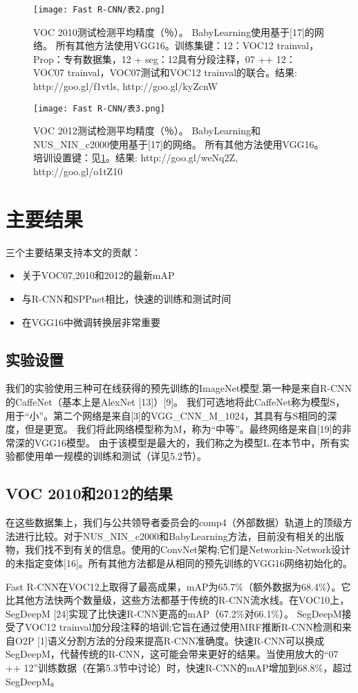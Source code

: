 \begin{figure}[h]
    \centering
    \texttt{[image: Fast R-CNN/表2.png]}
    \caption{ VOC 2010测试检测平均精度（％）。 BabyLearning使用基于[17]的网络。 所有其他方法使用VGG16。训练集键：12：VOC12 trainval，Prop：专有数据集，12 + seg：12具有分段注释，07 ++ 12：VOC07 trainval，VOC07测试和VOC12 trainval的联合。结果: http://goo.gl/f1vtls, http://goo.gl/kyZcnW}
    \label{表2}
\end{figure}

\begin{figure}[h]
    \centering
    \texttt{[image: Fast R-CNN/表3.png]}
    \caption{VOC 2012测试检测平均精度（％）。 BabyLearning和NUS\_NIN\_c2000使用基于[17]的网络。 所有其他方法使用VGG16。培训设置键：见\ref{表2}。结果: http://goo.gl/weNq2Z, http://goo.gl/o1tZ10}
    \label{表3}
\end{figure}

\section{主要结果}
\par 三个主要结果支持本文的贡献：
\begin{itemize}
    \item 关于VOC07,2010和2012的最新mAP
    \item 与R-CNN和SPPnet相比，快速的训练和测试时间
    \item 在VGG16中微调转换层非常重要
\end{itemize}

\subsection{实验设置}
\par 我们的实验使用三种可在线获得的预先训练的ImageNet模型.第一种是来自R-CNN的CaffeNet（基本上是AlexNet [13]）[9]。 我们可选地将此CaffeNet称为模型S，用于“小”。第二个网络是来自[3]的VGG\_CNN\_M\_1024，其具有与S相同的深度，但是更宽。 我们将此网络模型称为M，称为“中等”。最终网络是来自[19]的非常深的VGG16模型。 由于该模型是最大的，我们称之为模型L.在本节中，所有实验都使用单一规模的训练和测试（详见5.2节）。

\subsection{VOC 2010和2012的结果}
\par 在这些数据集上，我们与公共领导者委员会的comp4（外部数据）轨道上的顶级方法进行比较。对于NUS\_NIN\_c2000和BabyLearning方法，目前没有相关的出版物，我们找不到有关的信息。使用的ConvNet架构;它们是Networkin-Network设计的未指定变体[16]。所有其他方法都是从相同的预先训练的VGG16网络初始化的。
\par Fast R-CNN在VOC12上取得了最高成果，mAP为65.7\%（额外数据为68.4\%）。它比其他方法快两个数量级，这些方法都基于传统的R-CNN流水线。在VOC10上，SegDeepM [24]实现了比快速R-CNN更高的mAP（67.2\%对66.1\%）。 SegDeepM接受了VOC12 trainval加分段注释的培训;它旨在通过使用MRF推断R-CNN检测和来自O2P [1]语义分割方法的分段来提高R-CNN准确度。快速R-CNN可以换成SegDeepM，代替传统的R-CNN，这可能会带来更好的结果。当使用放大的“07 ++ 12”训练数据（在第5.3节中讨论）时，快速R-CNN的mAP增加到68.8\%，超过SegDeepM。

